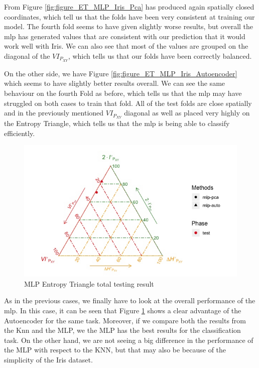 \documentclass[12pt]{report}
\begin{document}
From Figure \ref{fig:figure_ET_MLP_Iris_Pca} has produced again spatially closed coordinates, which tell us that the folds have been very consistent at training our model. The fourth fold seems to have given slightly worse results, but overall the mlp has generated values that are consistent with our prediction that it would work well with Iris. We can also see that most of the values are grouped on the diagonal of the $VI_{P_{XY}}$, which tells us that our folds have been correctly balanced. \par

On the other side, we have Figure \ref{fig:figure_ET_MLP_Iris_Autoencoder} which seems to have slightly better results overall. We can see the same behaviour on the fourth Fold as before, which tells us that the mlp may have struggled on both cases to train that fold. All of the test folds are close spatially and in the previously mentioned $VI_{P_{XY}}$ diagonal as well as placed very highly on the Entropy Triangle, which tells us that the mlp is being able to classify efficiently. \par
 
 
\begin{figure}[H]
	
	\includegraphics[width=1\linewidth]{Figuras_tfg/ET_Total_Iris_Mlp}
	\caption{MLP Entropy Triangle total testing result}
	\label{fig:figure_ET_Total_MLP_Iris}
\end{figure}

As in the previous cases, we finally have to look at the overall performance of the mlp. In this case, it can be seen that Figure \ref{fig:figure_ET_Total_MLP_Iris} shows a clear advantage of the Autoencoder for the same task. Moreover, if we compare both the results from the Knn and the MLP, we the MLP has the best results for the classification task. On the other hand, we are not seeing a big difference in the performance of the MLP with respect to the KNN, but that may also be because of the simplicity of the Iris dataset.
\end{document}
